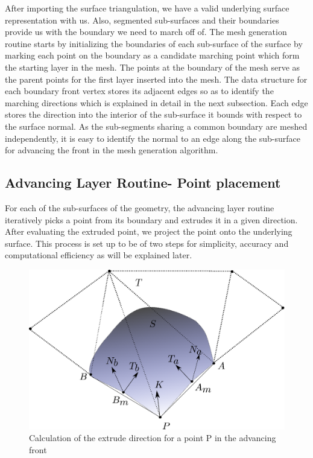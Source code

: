 \documentclass[conf]{new-aiaa}
\begin{document}
After importing the surface triangulation, we have a valid underlying surface representation with us. Also, segmented sub-surfaces and their boundaries provide us with the boundary we need to march off of. The mesh generation routine starts by initializing the boundaries of each sub-surface of the surface by marking each point on the boundary as a candidate marching point which form the starting layer in the mesh. The points at the boundary of the mesh serve as the parent points for the first layer inserted into the mesh. The data structure for each boundary front vertex stores its adjacent edges so as to identify the marching directions which is explained in detail in the next subsection. Each edge stores the direction into the interior of the sub-surface it bounds with respect to the surface normal. As the sub-segments sharing a common boundary are meshed independently, it is easy to identify the normal to an edge along the sub-surface for advancing the front in the mesh generation algorithm.

\subsection{Advancing Layer Routine- Point placement} \label{advancing-layer}

For each of the sub-surfaces of the geometry, the advancing layer routine iteratively picks a point from its boundary and extrudes it in a given direction. After evaluating the extruded point, we project the point onto the underlying surface. This process is set up to be of two steps for simplicity, accuracy and computational efficiency as will be explained later.

\begin{figure}[hbt!]
\centering
\includegraphics[width=.5\textwidth]{drawing-extrude-direction.eps}
\caption{Calculation of the extrude direction for a point P in the advancing front}
\label{extrude-direction}
\end{figure}
\end{document}
